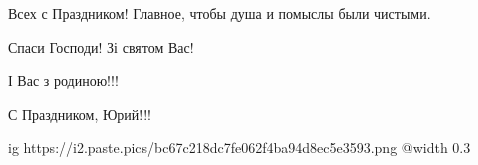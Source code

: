 \begin{itemize}
Всех с Праздником!
Главное, чтобы душа и помыслы были чистыми.

Спаси Господи! Зі святом Вас!

І Вас з родиною!!!

С Праздником, Юрий!!!


\ifcmt
  ig https://i2.paste.pics/bc67c218dc7fe062f4ba94d8ec5e3593.png
	@width 0.3
\fi



\end{itemize} %
